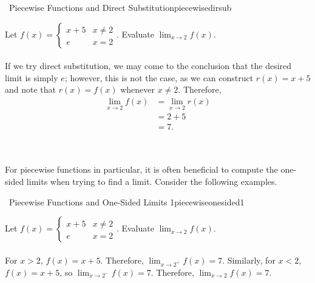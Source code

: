         \begin{example}{\Difficulty\,\Difficulty\,\,Piecewise Functions and Direct Substitution}{piecewisedirsub}

            Let \(f(x)=\begin{cases} x+5 & x \neq 2 \\ e & x=2 \end{cases}\). Evaluate \(\lim_{x \to 2}f(x)\).
            \\
            \\
            If we try direct substitution, we may come to the conclusion that the desired limit is simply \(e\); however, this is not the case, as we can construct \(r(x)=x+5\) and note that \(r(x)=f(x)\) whenever \(x\neq 2\). Therefore,
            \begin{align*}
                \lim_{x \to 2}f(x)&=\lim_{x \to 2}r(x) \\
                &=2+5 \\
                &=7.
            \end{align*}
            
        \end{example}
        \pagebreak
        \vphantom
        \\
        \\
        For piecewise functions in particular, it is often beneficial to compute the one-sided limits when trying to find a limit. Consider the following examples.
        \begin{example}{\Difficulty\,\Difficulty\,\,Piecewise Functions and One-Sided Limits 1}{piecewiseonesided1}

            Let \(f(x)=\begin{cases} x+5 & x \neq 2 \\ e & x=2 \end{cases}\). Evaluate \(\lim_{x \to 2}f(x)\).
            \\
            \\
            For \(x>2\), \(f(x)=x+5\). Therefore, \(\lim_{x\to 2^+}f(x)=7\). Similarly, for \(x<2\), \(f(x)=x+5\), so \(\lim_{x\to 2^-}f(x)=7\). Therefore, \(\lim_{x \to 2}f(x)=7\).
            
        \end{example}
